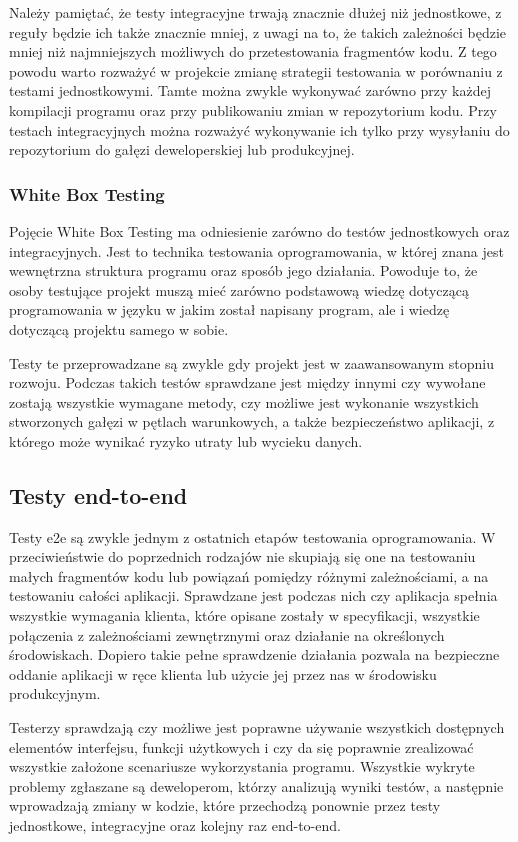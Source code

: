 Należy pamiętać, że testy integracyjne trwają znacznie dłużej niż jednostkowe, z reguły będzie ich także znacznie mniej, z uwagi na to, że takich zależności będzie mniej niż najmniejszych możliwych do przetestowania fragmentów kodu. Z tego powodu warto rozważyć w projekcie zmianę strategii testowania w porównaniu z testami jednostkowymi. Tamte można zwykle wykonywać zarówno przy każdej kompilacji programu oraz przy publikowaniu zmian w repozytorium kodu. Przy testach integracyjnych można rozważyć wykonywanie ich tylko przy wysyłaniu do repozytorium do gałęzi deweloperskiej lub produkcyjnej. 

\subsubsection{White Box Testing}
Pojęcie White Box Testing ma odniesienie zarówno do testów jednostkowych oraz integracyjnych. Jest to technika testowania oprogramowania, w której znana jest wewnętrzna struktura programu oraz sposób jego działania. Powoduje to, że osoby testujące projekt muszą mieć zarówno podstawową wiedzę dotyczącą programowania w języku w jakim został napisany program, ale i wiedzę dotyczącą projektu samego w sobie. 

Testy te przeprowadzane są zwykle gdy projekt jest w zaawansowanym stopniu rozwoju. Podczas takich testów sprawdzane jest między innymi czy wywołane zostają wszystkie wymagane metody, czy możliwe jest wykonanie wszystkich stworzonych gałęzi w pętlach warunkowych, a także bezpieczeństwo aplikacji, z którego może wynikać ryzyko utraty lub wycieku danych. 

\subsection{Testy end-to-end}
Testy e2e są zwykle jednym z ostatnich etapów testowania oprogramowania. W przeciwieństwie do poprzednich rodzajów nie skupiają się one na testowaniu małych fragmentów kodu lub powiązań pomiędzy różnymi zależnościami, a na testowaniu całości aplikacji. 
Sprawdzane jest podczas nich czy aplikacja spełnia wszystkie wymagania klienta, które opisane zostały w specyfikacji, wszystkie połączenia z zależnościami zewnętrznymi oraz działanie na określonych środowiskach. Dopiero takie pełne sprawdzenie działania pozwala na bezpieczne oddanie aplikacji w ręce klienta lub użycie jej przez nas w środowisku produkcyjnym. 

Testerzy sprawdzają czy możliwe jest poprawne używanie wszystkich dostępnych elementów interfejsu, funkcji użytkowych i czy da się poprawnie zrealizować wszystkie założone scenariusze wykorzystania programu. Wszystkie wykryte problemy zgłaszane są deweloperom, którzy analizują wyniki testów, a następnie wprowadzają zmiany w kodzie, które przechodzą ponownie przez testy jednostkowe, integracyjne oraz kolejny raz end-to-end.

